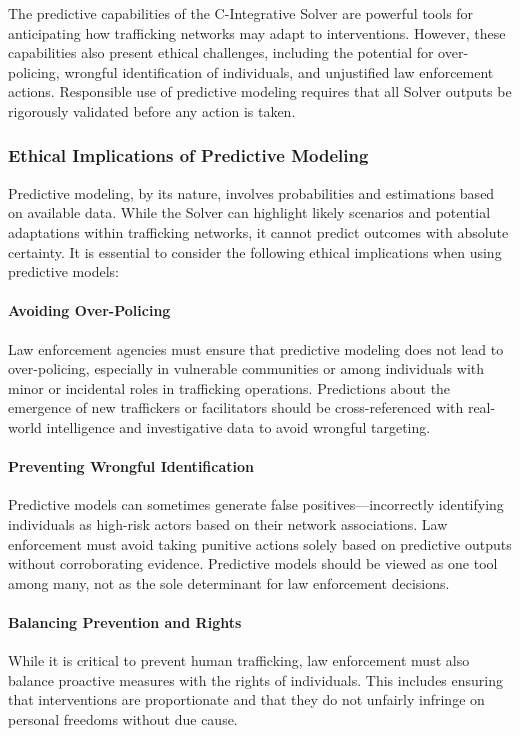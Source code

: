 \documentclass[%
 preprint, linenumbers,
 amsmath,amssymb,
 aps, physrev,
]{revtex4-2}
\begin{document}
The predictive capabilities of the C-Integrative Solver are powerful tools for anticipating how trafficking networks may adapt to interventions. However, these capabilities also present ethical challenges, including the potential for over-policing, wrongful identification of individuals, and unjustified law enforcement actions. Responsible use of predictive modeling requires that all Solver outputs be rigorously validated before any action is taken.

\subsubsection{Ethical Implications of Predictive Modeling}

Predictive modeling, by its nature, involves probabilities and estimations based on available data. While the Solver can highlight likely scenarios and potential adaptations within trafficking networks, it cannot predict outcomes with absolute certainty. It is essential to consider the following ethical implications when using predictive models:

\paragraph{Avoiding Over-Policing}
Law enforcement agencies must ensure that predictive modeling does not lead to over-policing, especially in vulnerable communities or among individuals with minor or incidental roles in trafficking operations. Predictions about the emergence of new traffickers or facilitators should be cross-referenced with real-world intelligence and investigative data to avoid wrongful targeting.

\paragraph{Preventing Wrongful Identification}
Predictive models can sometimes generate false positives—incorrectly identifying individuals as high-risk actors based on their network associations. Law enforcement must avoid taking punitive actions solely based on predictive outputs without corroborating evidence. Predictive models should be viewed as one tool among many, not as the sole determinant for law enforcement decisions.

\paragraph{Balancing Prevention and Rights}
While it is critical to prevent human trafficking, law enforcement must also balance proactive measures with the rights of individuals. This includes ensuring that interventions are proportionate and that they do not unfairly infringe on personal freedoms without due cause.
\end{document}
